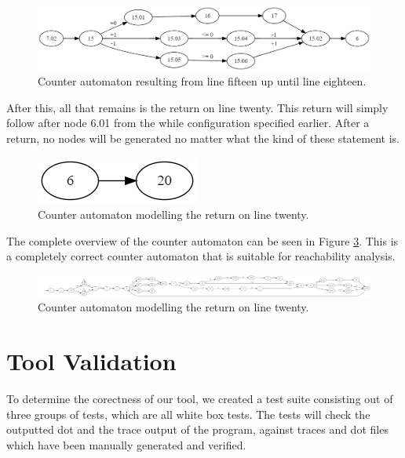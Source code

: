 \documentclass[12pt]{article}
\begin{document}
\begin{figure}[h]
	\centering
	\includegraphics[width=\linewidth]{final_overview_9}
	\caption{Counter automaton resulting from line fifteen up until line eighteen.}
	\label{fig:final_overview_9}
\end{figure}

After this, all that remains is the return on line twenty. This return will simply follow after node 6.01 from the while configuration specified earlier. After a return, no nodes will be generated no matter what the kind of these statement is.

\begin{figure}[h]
	\centering
	\includegraphics[width=0.35\linewidth]{final_overview_10}
	\caption{Counter automaton modelling the return on line twenty.}
	\label{fig:final_overview_10}
\end{figure}

The complete overview of the counter automaton can be seen in Figure \ref{fig:final_overview_11}. This is a completely correct counter automaton that is suitable for reachability analysis.

\begin{landscape}
	\begin{figure}
		\centering
		\includegraphics[width=\linewidth]{final_overview_11}
		\caption{Counter automaton modelling the return on line twenty.}
		\label{fig:final_overview_11}
	\end{figure}
\end{landscape}

\section{Tool Validation}
To determine the corectness of our tool, we created a test suite consisting out of three groups of tests, which are all white box tests. The tests will check the outputted dot and the trace output of the program, against traces and dot files which have been manually generated and verified.
\end{document}
